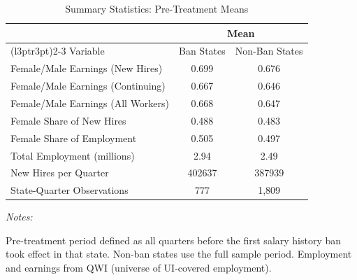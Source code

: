 \begin{table}[!h]
\centering
\caption{\label{tab:sumstats}Summary Statistics: Pre-Treatment Means}
\centering
\begin{threeparttable}
\begin{tabular}[t]{lcc}
\toprule
\multicolumn{1}{c}{ } & \multicolumn{2}{c}{Mean} \\
\cmidrule(l{3pt}r{3pt}){2-3}
Variable & Ban States & Non-Ban States\\
\midrule
Female/Male Earnings (New Hires) & 0.699 & 0.676\\
Female/Male Earnings (Continuing) & 0.667 & 0.646\\
Female/Male Earnings (All Workers) & 0.668 & 0.647\\
Female Share of New Hires & 0.488 & 0.483\\
Female Share of Employment & 0.505 & 0.497\\
\addlinespace
Total Employment (millions) & 2.94 & 2.49\\
New Hires per Quarter & 402637 & 387939\\
State-Quarter Observations & 777 & 1,809\\
\bottomrule
\end{tabular}
\begin{tablenotes}[para]
\item \textit{Notes:} 
\item Pre-treatment period defined as all quarters before the first salary history ban took effect in that state. Non-ban states use the full sample period. Employment and earnings from QWI (universe of UI-covered employment).
\end{tablenotes}
\end{threeparttable}
\end{table}
